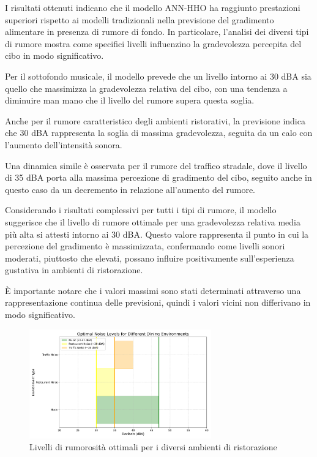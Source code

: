 I risultati ottenuti indicano che il modello ANN-HHO ha raggiunto prestazioni superiori rispetto ai modelli tradizionali nella previsione del gradimento alimentare in presenza di rumore di fondo. In particolare, l'analisi dei diversi tipi di rumore mostra come specifici livelli influenzino la gradevolezza percepita del cibo in modo significativo.

Per il sottofondo musicale, il modello prevede che un livello intorno ai 30 dBA sia quello che massimizza la gradevolezza relativa del cibo, con una tendenza a diminuire man mano che il livello del rumore supera questa soglia.

Anche per il rumore caratteristico degli ambienti ristorativi, la previsione indica che 30 dBA rappresenta la soglia di massima gradevolezza, seguita da un calo con l'aumento dell'intensità sonora.

Una dinamica simile è osservata per il rumore del traffico stradale, dove il livello di 35 dBA porta alla massima percezione di gradimento del cibo, seguito anche in questo caso da un decremento in relazione all'aumento del rumore.

Considerando i risultati complessivi per tutti i tipi di rumore, il modello suggerisce che il livello di rumore ottimale per una gradevolezza relativa media più alta si attesti intorno ai 30 dBA. Questo valore rappresenta il punto in cui la percezione del gradimento è massimizzata, confermando come livelli sonori moderati, piuttosto che elevati, possano influire positivamente sull'esperienza gustativa in ambienti di ristorazione.

È importante notare che i valori massimi sono stati determinati attraverso una rappresentazione continua delle previsioni, quindi i valori vicini non differivano in modo significativo.

\begin{figure}[H]
      \centering
      \includegraphics[width=0.7\textwidth]{Chapters/Figures/optimal_noise_levels_improved.pdf} %
      \caption{\small Livelli di rumorosità ottimali per i diversi ambienti di ristorazione}
      \label{fig:graph_label}
\end{figure}

